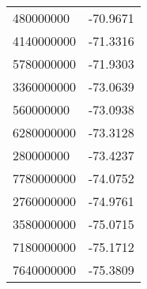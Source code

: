 \begin{tabular}{ll}
480000000 & -70.9671 \\ 
4140000000 & -71.3316 \\ 
5780000000 & -71.9303 \\ 
3360000000 & -73.0639 \\ 
560000000 & -73.0938 \\ 
6280000000 & -73.3128 \\ 
280000000 & -73.4237 \\ 
7780000000 & -74.0752 \\ 
2760000000 & -74.9761 \\ 
3580000000 & -75.0715 \\ 
7180000000 & -75.1712 \\ 
7640000000 & -75.3809 \\ 
\hline 
\end{tabular}